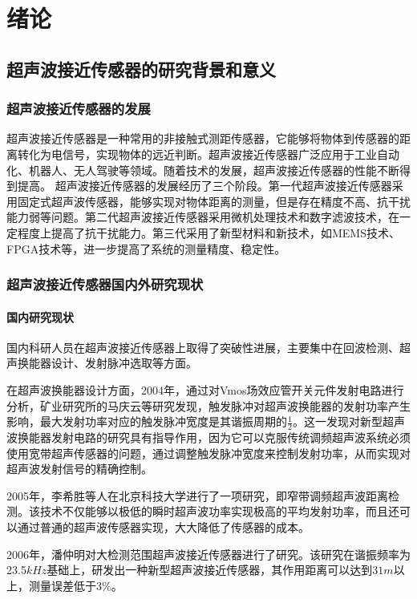	\newpage
	\section{绪论}
    \subsection{超声波接近传感器的研究背景和意义}
    \subsubsection{超声波接近传感器的发展}
    超声波接近传感器是一种常用的非接触式测距传感器，它能够将物体到传感器的距离转化为电信号，实现物体的远近判断。超声波接近传感器广泛应用于工业自动化、机器人、无人驾驶等领域。随着技术的发展，超声波接近传感器的性能不断得到提高。    
    超声波接近传感器的发展经历了三个阶段。第一代超声波接近传感器采用固定式超声波传感器，能够实现对物体距离的测量，但是存在精度不高、抗干扰能力弱等问题。第二代超声波接近传感器采用微机处理技术和数字滤波技术，在一定程度上提高了抗干扰能力。第三代采用了新型材料和新技术，如MEMS技术、FPGA技术等，进一步提高了系统的测量精度、稳定性。
    \subsubsection{超声波接近传感器国内外研究现状}
    \paragraph{国内研究现状}
	国内科研人员在超声波接近传感器上取得了突破性进展，主要集中在回波检测、超声换能器设计、发射脉冲选取等方面。
	
	在超声波换能器设计方面，2004年，通过对Vmos场效应管开关元件发射电路进行分析，矿业研究所的马庆云等研究发现，触发脉冲对超声波换能器的发射功率产生影响，最大发射功率对应的触发脉冲宽度是其谐振周期的$\frac{1}{2}$。这一发现对新型超声波换能器发射电路的研究具有指导作用，因为它可以克服传统调频超声波系统必须使用宽带超声传感器的问题，通过调整触发脉冲宽度来控制发射功率，从而实现对超声波发射信号的精确控制。
	
	2005年，李希胜等人在北京科技大学进行了一项研究，即窄带调频超声波距离检测。该技术不仅能够以极低的瞬时超声波功率实现极高的平均发射功率，而且还可以通过普通的超声波传感器实现，大大降低了传感器的成本。
	
	2006年，潘仲明对大检测范围超声波接近传感器进行了研究。该研究在谐振频率为23.5$kHz$基础上，研发出一种新型超声波接近传感器，其作用距离可以达到$31m$以上，测量误差低于$3\%$。
		
